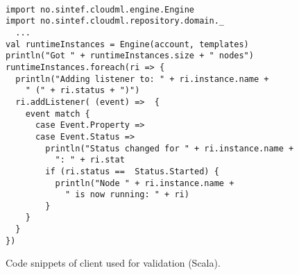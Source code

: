 \begin{figure}[tb]
  \begin{center}
    \begin{verbatim}

import no.sintef.cloudml.engine.Engine
import no.sintef.cloudml.repository.domain._
  ...
val runtimeInstances = Engine(account, templates)
println("Got " + runtimeInstances.size + " nodes")
runtimeInstances.foreach(ri => {
  println("Adding listener to: " + ri.instance.name + 
    " (" + ri.status + ")")
  ri.addListener( (event) =>  {
    event match {
      case Event.Property => 
      case Event.Status => 
        println("Status changed for " + ri.instance.name + 
          ": " + ri.stat
        if (ri.status ==  Status.Started) {
          println("Node " + ri.instance.name + 
            " is now running: " + ri)
        }
    }
  }
})
    \end{verbatim}
  \end{center}
  \caption{Code snippets of client used for validation (Scala).}
  \label{list:validation-client}
\end{figure}

